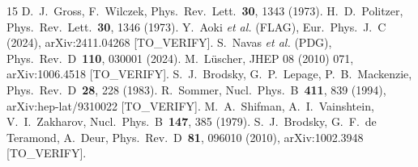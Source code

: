 \documentclass[aps,prl,reprint,superscriptaddress,floatfix,nofootinbib,amssymb]{revtex4-2}
\begin{document}
\begin{thebibliography}{15}
D.~J.~Gross, F.~Wilczek, Phys.~Rev.~Lett.~\textbf{30}, 1343 (1973).
H.~D.~Politzer, Phys.~Rev.~Lett.~\textbf{30}, 1346 (1973).
Y.~Aoki \emph{et al.} (FLAG), Eur.~Phys.~J.~C (2024), arXiv:2411.04268 [TO\_VERIFY].
S.~Navas \emph{et al.} (PDG), Phys.~Rev.~D~\textbf{110}, 030001 (2024).
M.~L\"uscher, JHEP 08 (2010) 071, arXiv:1006.4518 [TO\_VERIFY].
S.~J.~Brodsky, G.~P.~Lepage, P.~B.~Mackenzie, Phys.~Rev.~D~\textbf{28}, 228 (1983).
R.~Sommer, Nucl.~Phys.~B~\textbf{411}, 839 (1994), arXiv:hep-lat/9310022 [TO\_VERIFY].
M.~A.~Shifman, A.~I.~Vainshtein, V.~I.~Zakharov, Nucl.~Phys.~B~\textbf{147}, 385 (1979).
S.~J.~Brodsky, G.~F.~de Teramond, A.~Deur, Phys.~Rev.~D~\textbf{81}, 096010 (2010), arXiv:1002.3948 [TO\_VERIFY].
\end{thebibliography}
\end{document}
